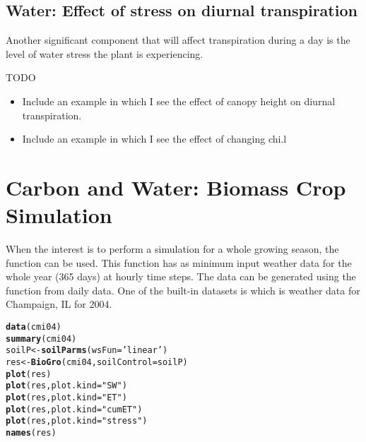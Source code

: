 \documentclass[12pt]{article}\usepackage[]{graphicx}\usepackage[]{color}
\makeatletter
\newcommand{\hlstr}[1]{\textcolor[rgb]{0.192,0.494,0.8}{#1}}%
\newcommand{\hlstd}[1]{\textcolor[rgb]{0.345,0.345,0.345}{#1}}%
\newcommand{\hlkwb}[1]{\textcolor[rgb]{0.69,0.353,0.396}{#1}}%
\newcommand{\hlkwc}[1]{\textcolor[rgb]{0.333,0.667,0.333}{#1}}%
\newcommand{\hlkwd}[1]{\textcolor[rgb]{0.737,0.353,0.396}{\textbf{#1}}}%
\newenvironment{kframe}{%
 \def\at@end@of@kframe{}%
 \ifinner\ifhmode%
  \def\at@end@of@kframe{\end{minipage}}%
  \begin{minipage}{\columnwidth}%
 \fi\fi%
 \def\FrameCommand##1{\hskip\@totalleftmargin \hskip-\fboxsep
 \colorbox{shadecolor}{##1}\hskip-\fboxsep
     \hskip-\linewidth \hskip-\@totalleftmargin \hskip\columnwidth}%
 \MakeFramed {\advance\hsize-\width
   \@totalleftmargin\z@ \linewidth\hsize
   \@setminipage}}%
 {\par\unskip\endMakeFramed%
 \at@end@of@kframe}
\newenvironment{knitrout}{}{} %
\makeatother
\begin{document}
\subsection{Water: Effect of stress on diurnal transpiration}

Another significant component that will affect transpiration during a
day is the level of water stress the plant is experiencing.





TODO
\begin{itemize}
\item Include an example in which I see the effect of canopy height on
  diurnal transpiration.
\item Include an example in which I see the effect of changing chi.l
\end{itemize}

\section{Carbon and Water: Biomass Crop Simulation}

When the interest is to perform a simulation for a whole growing
season, the function  can be used. This function has as
minimum input weather data for the whole year (365 days) at hourly
time steps. The data can be generated using the  function
from daily data. One of the built-in datasets is  which is
weather data for Champaign, IL for 2004.

\begin{knitrout}
\color{fgcolor}\begin{kframe}
\begin{alltt}
\hlkwd{data}\hlstd{(cmi04)}
\hlkwd{summary}\hlstd{(cmi04)}
\hlstd{soilP} \hlkwb{<-} \hlkwd{soilParms}\hlstd{(}\hlkwc{wsFun}\hlstd{=}\hlstr{'linear'}\hlstd{)}
\hlstd{res} \hlkwb{<-} \hlkwd{BioGro}\hlstd{(cmi04,} \hlkwc{soilControl}\hlstd{=soilP)}
\hlkwd{plot}\hlstd{(res)}
\hlkwd{plot}\hlstd{(res,} \hlkwc{plot.kind}\hlstd{=}\hlstr{"SW"}\hlstd{)}
\hlkwd{plot}\hlstd{(res,} \hlkwc{plot.kind}\hlstd{=}\hlstr{"ET"}\hlstd{)}
\hlkwd{plot}\hlstd{(res,} \hlkwc{plot.kind}\hlstd{=}\hlstr{"cumET"}\hlstd{)}
\hlkwd{plot}\hlstd{(res,} \hlkwc{plot.kind}\hlstd{=}\hlstr{"stress"}\hlstd{)}
\hlkwd{names}\hlstd{(res)}
\end{alltt}
\end{kframe}
\end{knitrout}
\end{document}
